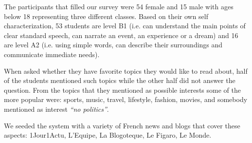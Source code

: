 The participants that filled our survey were 54 female and 15 male with ages below 18 representing three different classes. Based on their own self characterization, 53 students are level B1 (i.e. can understand the main points of clear standard speech, can narrate an event, an experience or a dream) and 16 are level A2 (i.e. using simple words, can describe their surroundings and communicate immediate needs). 


When asked whether they have favorite topics they would like to read about, half of the students mentioned such topics while the other half did not answer the question. From the topics that they mentioned as possible interests some of the more popular were: sports, music, travel, lifestyle, fashion, movies, and somebody mentioned as interest {\em ``no politics''}.

We seeded the system with a variety of French news and blogs that cover these aspects: 1Jour1Actu, L'Equipe, La Blogoteque, Le Figaro, Le Monde. 











